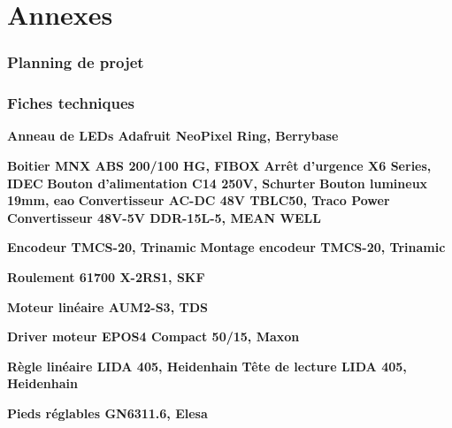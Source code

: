 \section*{Annexes}
\subsubsection*{Planning de projet}
\subsubsection*{Fiches techniques}

\textbf{Anneau de LEDs Adafruit NeoPixel Ring, Berrybase}

\textbf{Boitier MNX ABS 200/100 HG, FIBOX}
\newline \textbf{Arrêt d'urgence X6 Series, IDEC}
\newline \textbf{Bouton d'alimentation C14 250V, Schurter}
\newline \textbf{Bouton lumineux 19mm, eao}
\newline \textbf{Convertisseur AC-DC 48V TBLC50, Traco Power}
\newline \textbf{Convertisseur 48V-5V DDR-15L-5, MEAN WELL}

\textbf{Encodeur TMCS-20, Trinamic}
\newline
\textbf{Montage encodeur TMCS-20, Trinamic}

\textbf{Roulement 61700 X-2RS1, SKF}

\textbf{Moteur linéaire AUM2-S3, TDS}

\textbf{Driver moteur EPOS4 Compact 50/15, Maxon}

\textbf{Règle linéaire LIDA 405, Heidenhain}
\newline
\textbf{Tête de lecture LIDA 405, Heidenhain}

\textbf{Pieds réglables GN6311.6, Elesa}

\iffalse

    

    
    
    
    
    
    

